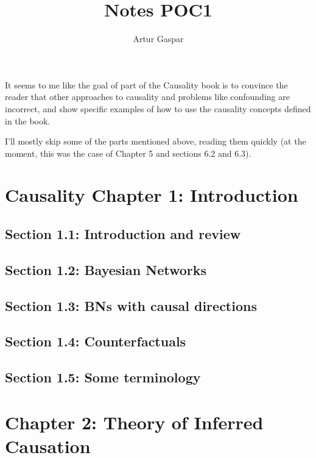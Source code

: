 \documentclass[oneside]{book}
\title{Notes POC1}
\author{Artur Gaspar}
\begin{document}
\maketitle
\tableofcontents

It seems to me like the goal of part of the Causality book is to convince the reader that other approaches to causality and problems like confounding are incorrect, and show specific examples of how to use the causality concepts defined in the book.

I'll mostly skip some of the parts mentioned above, reading them quickly (at the moment, this was the case of Chapter 5 and sections 6.2 and 6.3).

\chapter{Causality Chapter 1: Introduction}

\section{Section 1.1: Introduction and review}



\section{Section 1.2: Bayesian Networks}



\section{Section 1.3: BNs with causal directions}



\section{Section 1.4: Counterfactuals}



\section{Section 1.5: Some terminology}



\chapter{Chapter 2: Theory of Inferred Causation}
\end{document}
